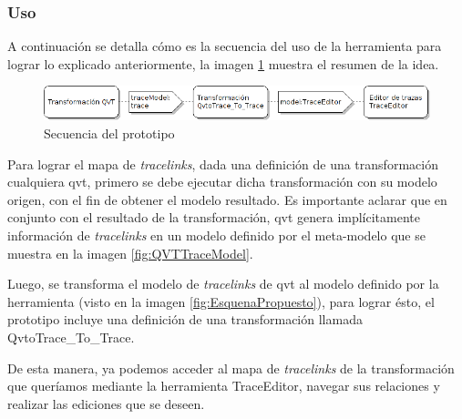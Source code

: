 \documentclass[a4paper,12pt,twoside,spanish,openright]{book}
\begin{document}
\subsubsection{Uso}

A continuación se detalla cómo es la secuencia del uso de la herramienta para lograr lo explicado anteriormente, la imagen \ref{fig:SecuenciaPrototipo} muestra el resumen de la idea.

\bigskip

\begin{figure}[hbtp]
\centering
\includegraphics[scale=.56]{./img/Secuencia_Prototipo}
\caption{Secuencia del prototipo}
\label{fig:SecuenciaPrototipo}
\end{figure}

\bigskip

Para lograr el mapa de \textit{tracelinks}, dada una definición de una transformación cualquiera \gls{qvt}, primero se debe ejecutar dicha transformación con su modelo origen, con el fin de obtener el modelo resultado. Es importante aclarar que en conjunto con el resultado de la transformación, \gls{qvt} genera implícitamente información de \textit{tracelinks} en un modelo definido por el meta-modelo que se muestra en la imagen \ref{fig:QVTTraceModel}. 

Luego, se transforma el modelo de \textit{tracelinks} de \gls{qvt} al modelo definido por la herramienta (visto en la imagen \ref{fig:EsquenaPropuesto}), para lograr ésto, el prototipo incluye una definición de una transformación llamada \textsf{QvtoTrace\_To\_Trace}.

De esta manera, ya podemos acceder al mapa de \textit{tracelinks} de la transformación que queríamos mediante la herramienta \textsf{TraceEditor}, navegar sus relaciones y realizar las ediciones que se deseen.
\end{document}
